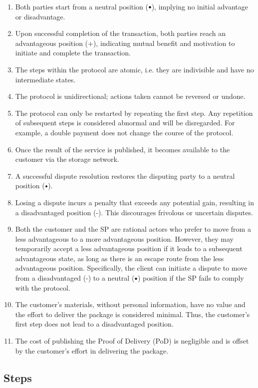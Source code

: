 \documentclass[pdftex,twocolumn,epjc3]{svjour3}
\newcommand{\plus}{+}
\newcommand{\minus}{-}
\newcommand\neutral[1][.75]{\mathbin{\ThisStyle{\vcenter{\hbox{%
  \scalebox{#1}{$\SavedStyle\bullet$}}}}}%
}
\begin{document}
\begin{enumerate}
\item Both parties start from a neutral position ($\neutral{}$), implying no initial advantage or disadvantage.
\item Upon successful completion of the transaction, both parties reach an advantageous position (\plus{}), indicating mutual benefit and motivation to initiate and complete the transaction.
\item The steps within the protocol are atomic, i.e. they are indivisible and have no intermediate states.
\item The protocol is unidirectional; actions taken cannot be reversed or undone.
\item The protocol can only be restarted by repeating the first step. Any repetition of subsequent steps is considered abnormal and will be disregarded. For example, a double payment does not change the course of the protocol.
\item Once the result of the service is published, it becomes available to the customer via the storage network.
\item A successful dispute resolution restores the disputing party to a neutral position ($\neutral{}$).
\item Losing a dispute incurs a penalty that exceeds any potential gain, resulting in a disadvantaged position (\minus{}). This discourages frivolous or uncertain disputes.
\item Both the customer and the SP are rational actors who prefer to move from a less advantageous to a more advantageous position. However, they may temporarily accept a less advantageous position if it leads to a subsequent advantageous state, as long as there is an escape route from the less advantageous position. Specifically, the client can initiate a dispute to move from a disadvantaged (\minus{}) to a neutral ($\neutral{}$) position if the SP fails to comply with the protocol.
\item The customer's materials, without personal information, have no value and the effort to deliver the package is considered minimal. Thus, the customer's first step does not lead to a disadvantaged position.
\item The cost of publishing the Proof of Delivery (PoD) is negligible and is offset by the customer's effort in delivering the package.
\end{enumerate}

\subsection{Steps}\label{sec:steps}
\end{document}
